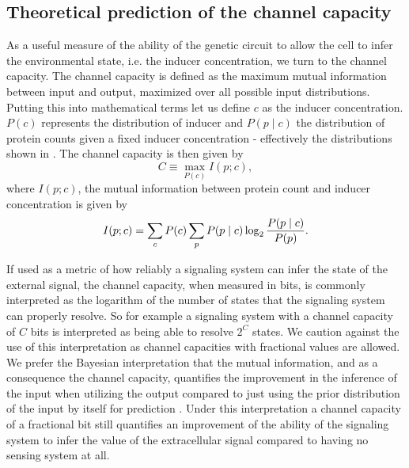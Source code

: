 \subsection{Theoretical prediction of the channel capacity}
\label{sec_channcap}

As a useful measure of the ability of the genetic circuit to allow the cell to
infer the environmental state, i.e. the inducer concentration, we turn to the
channel capacity. The channel capacity is defined as the maximum mutual
information between input and output, maximized over all possible input
distributions. Putting this into mathematical terms let us define $c$ as the
inducer concentration. $P(c)$ represents the distribution of inducer and $P(p
\mid c)$ the distribution of protein counts given a fixed inducer concentration
- effectively the distributions shown in . The channel
capacity is then given by
\begin{equation}
  C \equiv \max_{P(c)} I(p; c),
  \label{eq_chann_cap}
\end{equation}
where $I(p; c)$, the mutual information between protein count and inducer
concentration is given by \cite{Shannon1948}
\begin{equation}
  I(p; c) = \sum_c P(c) \sum_p P(p \mid c) \log_2 {P(p \mid c) \over P(p)}.
\end{equation}

If used as a metric of how reliably a signaling system can infer the state
of the external signal, the channel capacity, when measured in bits, is commonly
interpreted as the logarithm of the number of states that the signaling system
can properly resolve. So for example a signaling system with a channel capacity
of $C$ bits is interpreted as being able to resolve $2^C$ states. We caution
against the use of this interpretation as channel capacities with fractional
values are allowed. We prefer the Bayesian interpretation that the mutual
information, and as a consequence the channel capacity, quantifies the
improvement in the inference of the input when utilizing the output compared to
just using the prior distribution of the input by itself for prediction
\cite{Voliotis2014, Bowsher2014}. Under this interpretation a channel capacity
of a fractional bit still quantifies an improvement of the ability of the
signaling system to infer the value of the extracellular signal compared to
having no sensing system at all.

